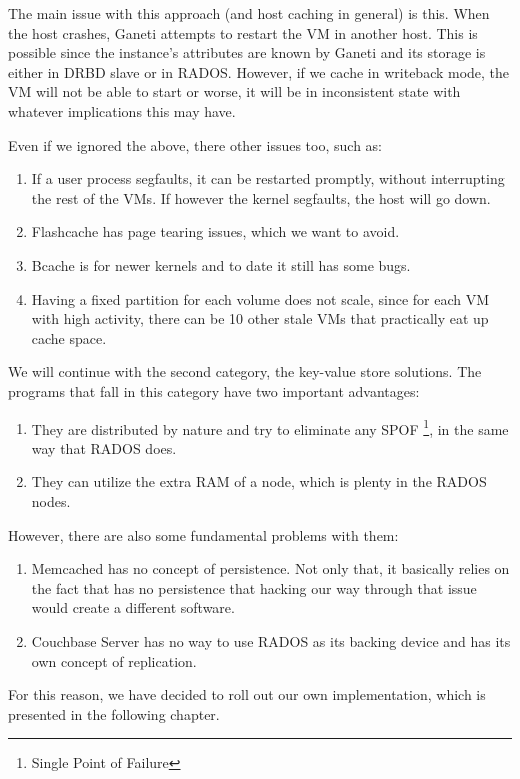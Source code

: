 The main issue with this approach (and host caching in general) is this. When 
the host crashes, Ganeti attempts to restart the VM in another host. This is 
possible since the instance's attributes are known by Ganeti and its storage is 
either in DRBD slave or in RADOS. However, if we cache in writeback mode, the 
VM will not be able to start or worse, it will be in inconsistent state with 
whatever implications this may have.

Even if we ignored the above, there other issues too, such as:

\begin{enumerate}
	\item If a user process segfaults, it can be restarted promptly, without 
		interrupting the rest of the VMs. If however the kernel segfaults, the 
		host will go down.
	\item Flashcache has page tearing issues, which we want to avoid.
	\item Bcache is for newer kernels and to date it still has some bugs.
	\item Having a fixed partition for each volume does not scale, since for 
		each VM with high activity, there can be 10 other stale VMs that 
		practically eat up cache space.
\end{enumerate}

We will continue with the second category, the key-value store solutions. The 
programs that fall in this category have two important advantages:

\begin{enumerate}
	\item They are distributed by nature and try to eliminate any SPOF
		\footnote{Single Point of Failure}, in the same way that RADOS does.
	\item They can utilize the extra RAM of a node, which is plenty in the 
		RADOS nodes.
\end{enumerate}

However, there are also some fundamental problems with them:

\begin{enumerate}
	\item Memcached has no concept of persistence. Not only that, it basically 
		relies on the fact that has no persistence that hacking our way through 
		that issue would create a different software.
	\item Couchbase Server has no way to use RADOS as its backing device and 
		has its own concept of replication.
\end{enumerate}

For this reason, we have decided to roll out our own implementation, which is 
presented in the following chapter.
